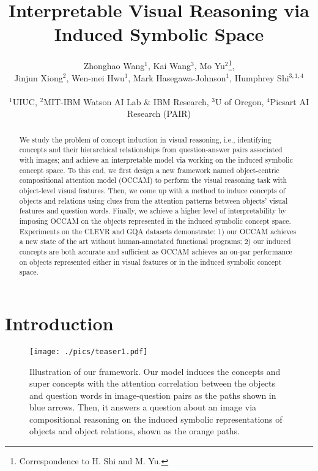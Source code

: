 \documentclass[10pt,twocolumn,letterpaper]{article}
\begin{document}
\title{Interpretable Visual Reasoning via Induced Symbolic Space}

\author{Zhonghao Wang$^{1}$, Kai Wang$^{3}$, Mo Yu$^{2}$\thanks{Correspondence to H. Shi and M. Yu.},  \\
Jinjun Xiong$^{2}$, Wen-mei Hwu$^{1}$, Mark Hasegawa-Johnson$^{1}$, Humphrey Shi$^{3,1,4}$\footnotemark[1]\\
\\

{\small $^1$UIUC, $^2$MIT-IBM Watson AI Lab \& IBM Research, $^3$U of Oregon, $^4$Picsart AI Research (PAIR)}}

\maketitle
\ificcvfinal\thispagestyle{empty}\fi

\begin{abstract}
We study the problem of concept induction in visual reasoning, i.e., identifying concepts and their hierarchical relationships from question-answer pairs associated with images; and achieve an interpretable model via working on the induced symbolic concept space.
To this end, we first design a new framework named object-centric compositional attention model (OCCAM) to perform the visual reasoning task with object-level visual features. Then, we come up with a method to induce concepts of objects and relations using clues from the attention patterns between objects' visual features and question words.
Finally, we achieve a higher level of interpretability by imposing OCCAM on the objects represented in the induced symbolic concept space.
Experiments on the CLEVR and GQA datasets demonstrate: 1) our OCCAM achieves a new state of the art without human-annotated functional programs; 2) our induced concepts are both accurate and sufficient as OCCAM achieves an on-par performance on objects represented either in visual features or in the induced symbolic concept space.
\end{abstract}


\vspace{-3mm}
\section{Introduction}

\begin{figure}[t]
\centering
\texttt{[image: ./pics/teaser1.pdf]}
\vspace{-3mm}
\caption{\small{Illustration of our framework. Our model induces the concepts and super concepts with the attention correlation between the objects and question words in image-question pairs as the paths shown in blue arrows. Then, it answers a question about an image via compositional reasoning on the induced symbolic representations of objects and object relations, shown as the orange paths.}}
\label{teaser}
\vspace{-6mm}
\end{figure}
\end{document}
